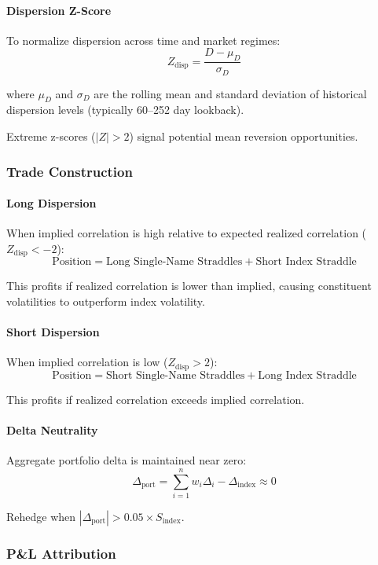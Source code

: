 \paragraph{Dispersion Z-Score}

To normalize dispersion across time and market regimes:
\[
Z_{\text{disp}} = \frac{D - \mu_D}{\sigma_D}
\]

where $\mu_D$ and $\sigma_D$ are the rolling mean and standard deviation of historical dispersion levels (typically 60--252 day lookback).

Extreme z-scores ($|Z| > 2$) signal potential mean reversion opportunities.

\subsubsection{Trade Construction}

\paragraph{Long Dispersion}

When implied correlation is high relative to expected realized correlation ($Z_{\text{disp}} < -2$):
\[
\text{Position} = \text{Long Single-Name Straddles} + \text{Short Index Straddle}
\]

This profits if realized correlation is lower than implied, causing constituent volatilities to outperform index volatility.

\paragraph{Short Dispersion}

When implied correlation is low ($Z_{\text{disp}} > 2$):
\[
\text{Position} = \text{Short Single-Name Straddles} + \text{Long Index Straddle}
\]

This profits if realized correlation exceeds implied correlation.

\paragraph{Delta Neutrality}

Aggregate portfolio delta is maintained near zero:
\[
\Delta_{\text{port}} = \sum_{i=1}^n w_i \Delta_i - \Delta_{\text{index}} \approx 0
\]

Rehedge when $|\Delta_{\text{port}}| > 0.05 \times S_{\text{index}}$.

\subsubsection{P\&L Attribution}


